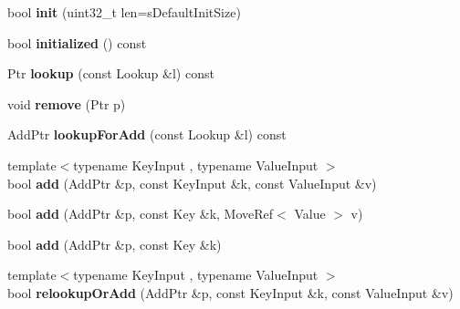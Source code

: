\begin{DoxyCompactItemize}
\item 
\hypertarget{classjs_1_1_hash_map_afbbb312c85f13999f00a6fca76f1bc87}{bool {\bfseries init} (uint32\-\_\-t len=s\-Default\-Init\-Size)}\label{classjs_1_1_hash_map_afbbb312c85f13999f00a6fca76f1bc87}

\item 
\hypertarget{classjs_1_1_hash_map_add0f44f7a989e9ec8e317928813b7ff8}{bool {\bfseries initialized} () const }\label{classjs_1_1_hash_map_add0f44f7a989e9ec8e317928813b7ff8}

\item 
\hypertarget{classjs_1_1_hash_map_a906f95025b153843ea72a4c281288943}{Ptr {\bfseries lookup} (const Lookup \&l) const }\label{classjs_1_1_hash_map_a906f95025b153843ea72a4c281288943}

\item 
\hypertarget{classjs_1_1_hash_map_a785bcb08a6494bcf2548887e66ccadea}{void {\bfseries remove} (Ptr p)}\label{classjs_1_1_hash_map_a785bcb08a6494bcf2548887e66ccadea}

\item 
\hypertarget{classjs_1_1_hash_map_af280342c01e2321afc83dd353e78f2a4}{Add\-Ptr {\bfseries lookup\-For\-Add} (const Lookup \&l) const }\label{classjs_1_1_hash_map_af280342c01e2321afc83dd353e78f2a4}

\item 
\hypertarget{classjs_1_1_hash_map_a7551b1a959123ad30bc4a28e44915848}{{\footnotesize template$<$typename Key\-Input , typename Value\-Input $>$ }\\bool {\bfseries add} (Add\-Ptr \&p, const Key\-Input \&k, const Value\-Input \&v)}\label{classjs_1_1_hash_map_a7551b1a959123ad30bc4a28e44915848}

\item 
\hypertarget{classjs_1_1_hash_map_a1580f81ab1dc34921d41a1b0ba8a6643}{bool {\bfseries add} (Add\-Ptr \&p, const Key \&k, Move\-Ref$<$ Value $>$ v)}\label{classjs_1_1_hash_map_a1580f81ab1dc34921d41a1b0ba8a6643}

\item 
\hypertarget{classjs_1_1_hash_map_ae34adf6637360d0c9a4f8448cca5120a}{bool {\bfseries add} (Add\-Ptr \&p, const Key \&k)}\label{classjs_1_1_hash_map_ae34adf6637360d0c9a4f8448cca5120a}

\item 
\hypertarget{classjs_1_1_hash_map_a451dd0917ff93675c8ae2fce28a8b121}{{\footnotesize template$<$typename Key\-Input , typename Value\-Input $>$ }\\bool {\bfseries relookup\-Or\-Add} (Add\-Ptr \&p, const Key\-Input \&k, const Value\-Input \&v)}\label{classjs_1_1_hash_map_a451dd0917ff93675c8ae2fce28a8b121}


\end{DoxyCompactItemize}
